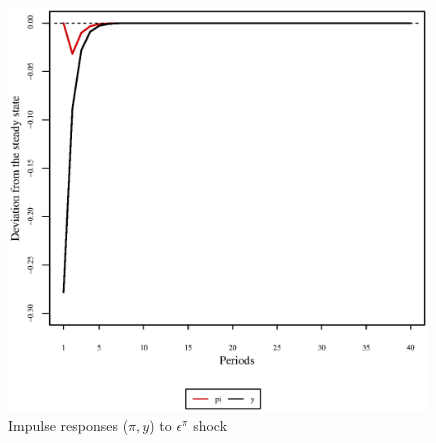 \begin{figure}[h]
\centering
\begin{minipage}{0.5\textwidth}
\vspace*{-3em}
\centering
\includegraphics[width=0.99\textwidth, scale=0.55]{plots/plot_32.eps}
\caption{Impulse responses ($\pi, y$) to $\epsilon^{\pi}$ shock}
\end{minipage}
\end{figure}
